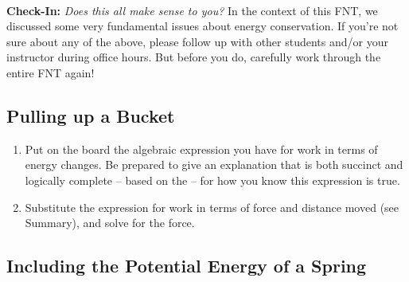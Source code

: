 \WCD\\

\begin{overview}
	\textbf{Check-In:} \emph{Does this all make sense to you?} In the context of this FNT, we discussed some very fundamental issues about energy conservation. If you're not sure about any of the above, please follow up with other students and/or your instructor during office hours. But before you do, carefully work through the entire FNT again!
\end{overview}

\subsection{Pulling up a Bucket}
\label{act2.1.3b}

\begin{fnt}
	
\end{fnt}


\begin{enumerate}
	\item Put on the board the algebraic expression you have for work in terms of energy changes. Be prepared to give an explanation that is both succinct and logically complete -- based on the \EnergyInteractionModel{} -- for how you know this expression is true.
	
	\item Substitute the expression for work in terms of force and distance moved (see \EnergyInteractionModel{} Summary), and solve for the force.
\end{enumerate}

\WCD
 
\subsection{Including the Potential Energy of a Spring}
\label{act2.1.3c}


